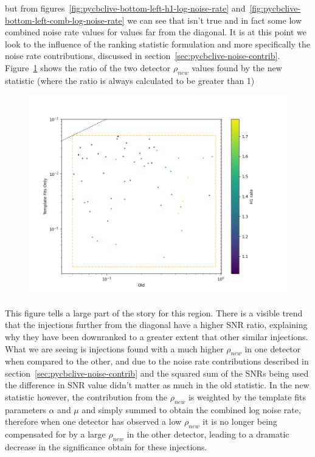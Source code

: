 %
but from figures~\ref{fig:pycbclive-bottom-left-h1-log-noise-rate} and~\ref{fig:pycbclive-bottom-left-comb-log-noise-rate} we can see that isn't true and in fact some low combined noise rate values for values far from the diagonal. It is at this point we look to the influence of the ranking statistic formulation and more specifically the noise rate contributions, discussed in section~\ref{sec:pycbclive-noise-contrib}. Figure~\ref{fig:pycbclive-bottom-left-snr-ratio} shows the ratio of the two detector $\rho_{new}$ values found by the new statistic (where the ratio is always calculated to be greater than 1)
%
\begin{figure}
  \centering
  \begin{minipage}[t]{1.0\linewidth}
  
    \includegraphics[width=1\textwidth]{images/5_pycbclive/bl_snr_ratio.png}
    \caption{}
    \label{fig:pycbclive-bottom-left-snr-ratio}
  
  \end{minipage}
\end{figure}
%
This figure tells a large part of the story for this region. There is a visible trend that the injections further from the diagonal have a higher SNR ratio, explaining why they have been downranked to a greater extent that other similar injections. What we are seeing is injections found with a much higher $\rho_{new}$ in one detector when compared to the other, and due to the noise rate contributions described in section~\ref{sec:pycbclive-noise-contrib} and the squared sum of the SNRs being used the difference in SNR value didn't matter as much in the old statistic. In the new statistic however, the contribution from the $\rho_{new}$ is weighted by the template fits parameters $\alpha$ and $\mu$ and simply summed to obtain the combined log noise rate, therefore when one detector has observed a low $\rho_{new}$ it is no longer being compensated for by a large $\rho_{new}$ in the other detector, leading to a dramatic decrease in the significance obtain for these injections.

